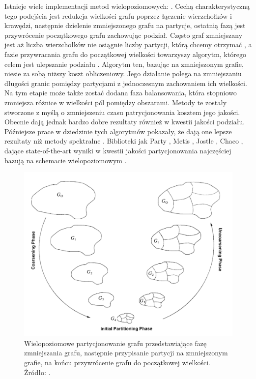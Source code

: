 Istnieje wiele implementacji metod wielopoziomowych: \cite{metis, jostle, Bui1993AHF, 103500, 185177, 279334, inproceedings, 129970, 10.1145/165939.165942}.
Cechą charakterystyczną tego podejścia jest redukcja
wielkości grafu poprzez łączenie wierzchołków i krawędzi, następnie dzielenie zmniejszonego grafu na partycje, ostatnią fazą
jest przywrócenie początkowego grafu zachowując podział. Często graf zmniejszany jest aż liczba wierzchołków nie osiągnie
liczby partycji, którą chcemy otrzymać \cite{1364754}, a fazie przywracania grafu do początkowej wielkości towarzyszy
algorytm, którego celem jest ulepszanie podziału \cite{article, 10.5555/800263.809204}. Algorytm ten, bazując na zmniejszonym
grafie, niesie za sobą niższy koszt obliczeniowy. Jego działanie polega na zmniejszaniu długości granic pomiędzy partycjami
z jednoczesnym zachowaniem ich wielkości. Na tym etapie może także zostać dodana faza balansowania, która stopniowo zmniejsza różnice
w wielkości pól pomiędzy obszarami. Metody te zostały stworzone z myślą o zmniejszeniu czasu
patrycjonowania kosztem jego jakości. Obecnie dają jednak bardzo dobre rezultaty również w kwestii jakości podziału.
Późniejsze prace w dziedzinie tych algorytmów pokazały, że dają one lepsze rezultaty niż metody spektralne \cite{metis}.
Biblioteki jak Party \cite{1364754}, Metis \cite{metis}, Jostle \cite{jostle}, Chaco \cite{inproceedings},
dające state-of-the-art wyniki w kwestii jakości partycjonowania najczęściej bazują na schemacie wielopoziomowym
\cite{inproceedings}.

\begin{figure}[h]
    \centering
    \includegraphics[width=0.9\linewidth]{images/coarsening}
    \caption{Wielopoziomowe partycjonowanie grafu przedstawiające fazę zmniejszania grafu, następnie przypisanie
    partycji na zmniejszonym grafie, na końcu przywrócenie grafu do początkowej wielkości.
    Źródło: \cite{KARYPIS199896}.}
    \label{im:multilevel_partitioning}
\end{figure}



